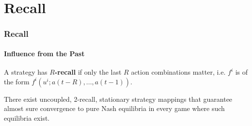 \documentclass{beamer}
\begin{document}



\section{Recall}

\begin{frame}
    \frametitle{Recall}
    \framesubtitle{Influence from the Past}
    \begin{definition}
        A strategy has $R$\textbf{-recall} if only the last $R$ action combinations matter,
        i.e. $f^i$ is of the form $f^i(u^i; a(t-R), ..., a(t-1))$.
    \end{definition}
    \pause
    \begin{theorem}
        There exist uncoupled, 2-recall, stationary strategy mappings that
        guarantee almost sure convergence to
        pure Nash equilibria  in every game where such equilibria exist.
    \end{theorem}
\end{frame}
\end{document}
